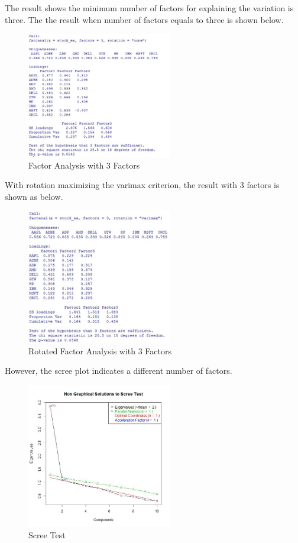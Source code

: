 \documentclass[10pt, conference]{IEEEtran}
\begin{document}
The result shows the minimum number of factors for explaining the variation is three. The the result when number of factors equals to three is shown below. 

\begin{figure}[!h]
\centering
\includegraphics[width=2.5in]{fig1.jpg}
\caption{Factor Analysis with 3 Factors}
\label{fig1}
\end{figure}

With rotation maximizing the varimax criterion, the result with 3 factors is shown as below. 

\begin{figure}[!h]
\centering
\includegraphics[width=2.5in]{fig2.jpg}
\caption{Rotated Factor Analysis with 3 Factors}
\label{fig2}
\end{figure}

However, the scree plot indicates a different number of factors. 

\begin{figure}[!h]
\centering
\includegraphics[width=2.5in]{fig3.jpg}
\caption{Scree Test}
\label{fig3}
\end{figure}
\end{document}
